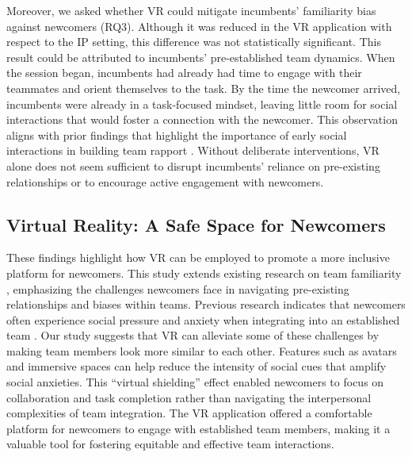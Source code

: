 Moreover, we asked whether VR could mitigate incumbents' familiarity bias against newcomers (RQ3). Although it was reduced in the VR application with respect to the IP setting, this difference was not statistically significant. This result could be attributed to incumbents' pre-established team dynamics. When the session began, incumbents had already had time to engage with their teammates and orient themselves to the task. By the time the newcomer arrived, incumbents were already in a task-focused mindset, leaving little room for social interactions that would foster a connection with the newcomer. This observation aligns with prior findings that highlight the importance of early social interactions in building team rapport \cite{10.1145/2998181.2998300, sawyer2010social}. Without deliberate interventions, VR alone does not seem sufficient to disrupt incumbents' reliance on pre-existing relationships or to encourage active engagement with newcomers.

\subsection{Virtual Reality: A Safe Space for Newcomers}
These findings highlight how VR can be employed to promote a more inclusive platform for newcomers. This study extends existing research on team familiarity \cite{10.1145/2998181.2998300, muskat2022team}, emphasizing the challenges newcomers face in navigating pre-existing relationships and biases within teams. Previous research indicates that newcomers often experience social pressure and anxiety when integrating into an established team \cite{kraut2010dealing, choi2004minority}. Our study suggests that VR can alleviate some of these challenges by making team members look more similar to each other. Features such as avatars and immersive spaces can help reduce the intensity of social cues that amplify social anxieties. This ``virtual shielding'' effect enabled newcomers to focus on collaboration and task completion rather than navigating the interpersonal complexities of team integration. The VR application offered a comfortable platform for newcomers to engage with established team members, making it a valuable tool for fostering equitable and effective team interactions.

